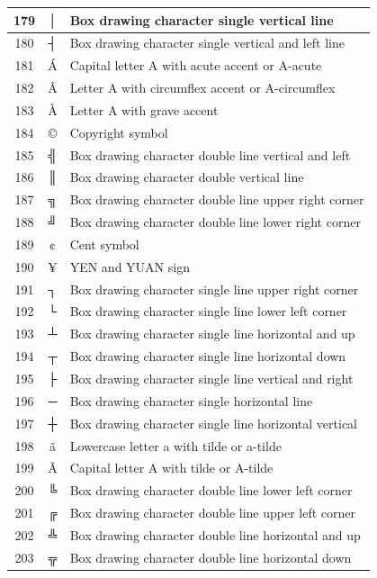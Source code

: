 {\begin{longtable}{|c|c|l|}
\hline
179 & │ & Box drawing character single vertical line \\
\hline
180 & ┤ & Box drawing character single vertical and left line \\
\hline
181 & Á & Capital letter A with acute accent or A-acute \\
\hline
182 & Â & Letter A with circumflex accent or A-circumflex \\
\hline
183 & À & Letter A with grave accent \\
\hline
184 & © & Copyright symbol \\
\hline
185 & ╣ & Box drawing character double line vertical and left \\
\hline
186 & ║ & Box drawing character double vertical line \\
\hline
187 & ╗ & Box drawing character double line upper right corner \\
\hline
188 & ╝ & Box drawing character double line lower right corner \\
\hline
189 & ¢ & Cent symbol \\
\hline
190 & ¥ & YEN and YUAN sign \\
\hline
191 & ┐ & Box drawing character single line upper right corner \\
\hline
192 & └ & Box drawing character single line lower left corner \\
\hline
193 & ┴ & Box drawing character single line horizontal and up \\
\hline
194 & ┬ & Box drawing character single line horizontal down \\
\hline
195 & ├ & Box drawing character single line vertical and right \\
\hline
196 & ─ & Box drawing character single horizontal line \\
\hline
197 & ┼ & Box drawing character single line horizontal vertical \\
\hline
198 & ã & Lowercase letter a with tilde or a-tilde \\
\hline
199 & Ã & Capital letter A with tilde or A-tilde \\
\hline
200 & ╚ & Box drawing character double line lower left corner \\
\hline
201 & ╔ & Box drawing character double line upper left corner \\
\hline
202 & ╩ & Box drawing character double line horizontal and up \\
\hline
203 & ╦ & Box drawing character double line horizontal down \\

\end{longtable}}
